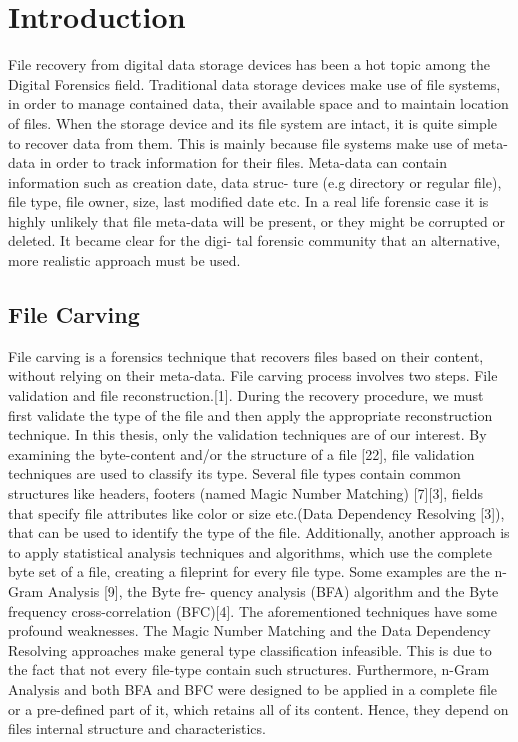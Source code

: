 \chapter{Introduction}
File recovery from digital data storage devices has been a hot topic among
the Digital Forensics field. Traditional data storage devices make use of
file systems, in order to manage contained data, their available space and to
maintain location of files. When the storage device and its file system are
intact, it is quite simple to recover data from them. This is mainly because
file systems make use of meta-data in order to track information for their
files. Meta-data can contain information such as creation date, data struc-
ture (e.g directory or regular file), file type, file owner, size, last modified
date etc. In a real life forensic case it is highly unlikely that file meta-data will be
present, or they might be corrupted or deleted. It became clear for the digi-
tal forensic community that an alternative, more realistic approach must be
used.

\section{File Carving}
File carving is a forensics technique that recovers files based on their content,
without relying on their meta-data. File carving process involves two steps.
File validation and file reconstruction.[1]. During the recovery procedure,
we must first validate the type of the file and then apply the appropriate
reconstruction technique. In this thesis, only the validation techniques are
of our interest.
By examining the byte-content and/or the structure of
a file [22], file validation techniques are used to classify its type. Several file
types contain common structures like headers, footers (named Magic Number
Matching) [7][3], fields that specify file attributes like color or size etc.(Data
Dependency Resolving [3]), that can be used to identify the type of the file.
Additionally, another approach is to apply statistical analysis techniques and
algorithms, which use the complete byte set of a file, creating a fileprint for
every file type. Some examples are the n-Gram Analysis [9], the Byte fre-
quency analysis (BFA) algorithm and the Byte frequency cross-correlation
(BFC)[4].
The aforementioned techniques have some profound weaknesses. The Magic
Number Matching and the Data Dependency Resolving approaches make
general type classification infeasible. This is due to the fact that not every
file-type contain such structures. Furthermore, n-Gram Analysis and both
BFA and BFC were designed to be applied in a complete file or a pre-defined
part of it, which retains all of its content. Hence, they depend on files internal structure and characteristics.

